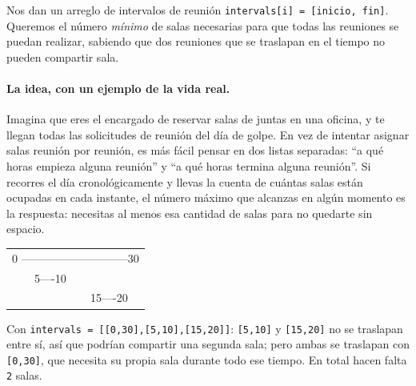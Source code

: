 
Nos dan un arreglo de intervalos de reunión \texttt{intervals[i] = [inicio,
fin]}. Queremos el número \emph{mínimo} de salas necesarias para que todas
las reuniones se puedan realizar, sabiendo que dos reuniones que se
traslapan en el tiempo no pueden compartir sala.

\paragraph{La idea, con un ejemplo de la vida real.} Imagina que eres el
encargado de reservar salas de juntas en una oficina, y te llegan todas las
solicitudes de reunión del día de golpe. En vez de intentar asignar salas
reunión por reunión, es más fácil pensar en dos listas separadas: ``a qué
horas empieza alguna reunión'' y ``a qué horas termina alguna reunión''.
Si recorres el día cronológicamente y llevas la cuenta de cuántas salas
están ocupadas en cada instante, el número máximo que alcanzas en algún
momento es la respuesta: necesitas al menos esa cantidad de salas para no
quedarte sin espacio.

\begin{center}
\ttfamily
\begin{tabular}{l}
0 -----------------------------30\\
\ \ \ \ 5----10\\
\ \ \ \ \ \ \ \ \ \ \ \ \ \ 15----20\\
\end{tabular}
\end{center}

\noindent Con \texttt{intervals = [[0,30],[5,10],[15,20]]}: \texttt{[5,10]}
y \texttt{[15,20]} no se traslapan entre sí, así que podrían compartir una
segunda sala; pero ambas se traslapan con \texttt{[0,30]}, que necesita su
propia sala durante todo ese tiempo. En total hacen falta \texttt{2} salas.

